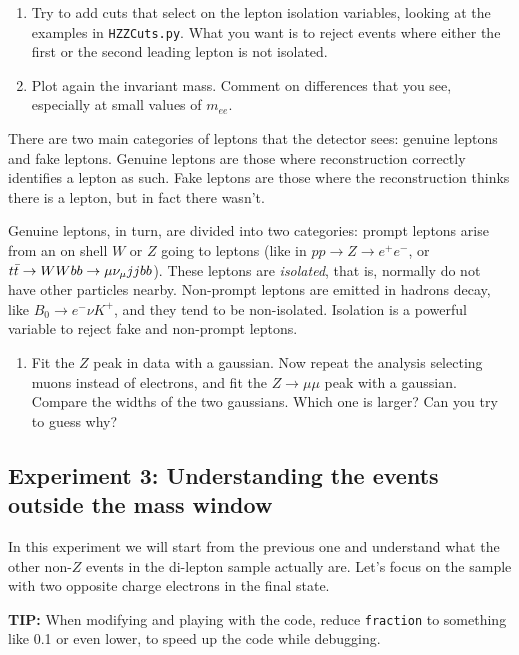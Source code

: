 \begin{enumerate} [resume]
\item  Try to add cuts that select on the lepton isolation variables, looking at the examples in  \verb|HZZCuts.py|. What you want is to reject events where either the first or the second leading lepton is not isolated. 
\item Plot again the invariant mass. Comment on differences that you see, especially at small values of $m_{ee}$. 
\end{enumerate}

\begin{mybox}
There are two main categories of leptons that the detector sees: genuine leptons and fake leptons. Genuine leptons are those where reconstruction correctly identifies a lepton as such. Fake leptons are those where the reconstruction thinks there is a lepton, but in fact there wasn't. 

Genuine leptons, in turn, are divided into two categories: prompt leptons arise from an on shell $W$ or $Z$ going to leptons (like in $pp\rightarrow Z\rightarrow e^+ e^-$, or $t\bar{t} \rightarrow WWbb \rightarrow \mu \nu_{\mu} jjbb$). These leptons are \textit{isolated}, that is, normally do not have other particles nearby. Non-prompt leptons are emitted in hadrons decay, like $B_0\rightarrow e^-\nu K^+$, and they tend to be non-isolated. Isolation is a powerful variable to reject fake and non-prompt leptons.   
\end{mybox}

\begin{enumerate} [resume]
\item Fit the $Z$ peak in data with a gaussian. Now repeat the analysis selecting muons instead of electrons, and fit the $Z\rightarrow \mu\mu$ peak with a gaussian. Compare the widths of the two gaussians. Which one is larger? Can you try to guess why?  
\end{enumerate}

\subsection{Experiment 3: Understanding the events outside the mass window}

In this experiment we will start from the previous one and understand what the other non-$Z$ events in the di-lepton sample actually are. Let's focus on the sample with two opposite charge electrons in the final state. 

\begin{mybox}
\textbf{TIP:} When modifying and playing with the code, reduce \verb|fraction| to something like 0.1 or even lower, to speed up the code while debugging.
\end{mybox}


